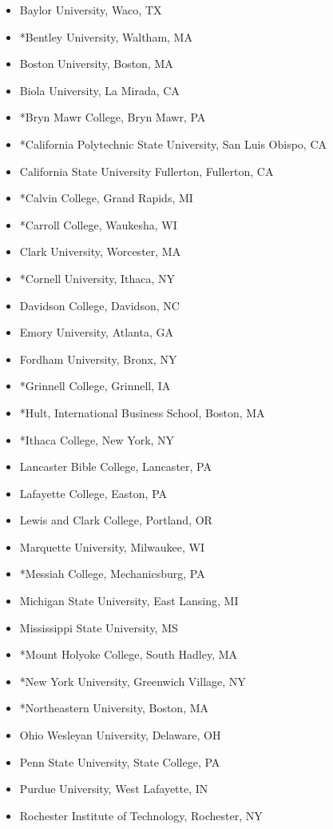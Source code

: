 \begin{itemize}
\item Baylor University, Waco, TX
\item *Bentley University, Waltham, MA
\item Boston University, Boston, MA
\item Biola University, La Mirada, CA
\item *Bryn Mawr College, Bryn Mawr, PA
\item *California Polytechnic State University, San Luis Obispo, CA
\item California State University Fullerton, Fullerton, CA
\item *Calvin College, Grand Rapids, MI
\item *Carroll College, Waukesha, WI
\item Clark University, Worcester, MA
\item *Cornell University, Ithaca, NY
\item Davidson College, Davidson, NC
\item Emory University, Atlanta, GA
\item Fordham University, Bronx, NY
\item *Grinnell College, Grinnell, IA
\item *Hult, International Business School, Boston, MA
\item *Ithaca College, New York, NY
\item Lancaster Bible College, Lancaster, PA
\item Lafayette College, Easton, PA
\item Lewis and Clark College, Portland, OR
\item Marquette University, Milwaukee, WI
\item *Messiah College, Mechanicsburg, PA
\item Michigan State University, East Lansing, MI
\item Mississippi State University, MS
\item *Mount Holyoke College, South Hadley, MA
\item *New York University, Greenwich Village, NY
\item *Northeastern University, Boston, MA
\item Ohio Wesleyan University, Delaware, OH
\item Penn State University, State College, PA
\item Purdue University, West Lafayette, IN
\item Rochester Institute of Technology, Rochester, NY

\end{itemize}
